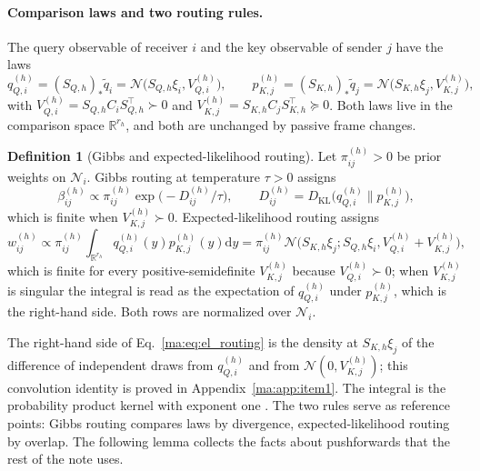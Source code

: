 \documentclass[11pt]{article}
\theoremstyle{definition}
\newtheorem{definition}[theorem]{Definition}
\theoremstyle{remark}
\providecommand{\KL}{D_{\mathrm{KL}}}
\newcommand{\R}{\mathbb R}
\newcommand{\Nset}{\mathcal N}
\newcommand{\Gauss}{\mathcal N}
\newcommand{\qt}{\widetilde q}
\begin{document}
\paragraph{Comparison laws and two routing rules.}
The query observable of receiver $i$ and the key observable of sender $j$ have the laws
\begin{equation}
q^{(h)}_{Q,i}=(S_{Q,h})_*\qt_i=\Gauss\bigl(S_{Q,h}\xi_i,V^{(h)}_{Q,i}\bigr),\qquad
p^{(h)}_{K,j}=(S_{K,h})_*\qt_j=\Gauss\bigl(S_{K,h}\xi_j,V^{(h)}_{K,j}\bigr),
\label{ma:eq:comparison_laws}
\end{equation}
with $V^{(h)}_{Q,i}=S_{Q,h}C_iS_{Q,h}^\top\succ0$ and $V^{(h)}_{K,j}=S_{K,h}C_jS_{K,h}^\top\succeq0$. Both laws live in the comparison space $\R^{r_h}$, and both are unchanged by passive frame changes.

\begin{definition}[Gibbs and expected-likelihood routing]
\label{ma:def:routing}
Let $\pi^{(h)}_{ij}>0$ be prior weights on $\Nset_i$. Gibbs routing at temperature $\tau>0$ assigns
\begin{equation}
\beta^{(h)}_{ij}\propto\pi^{(h)}_{ij}\exp\bigl(-D^{(h)}_{ij}/\tau\bigr),\qquad D^{(h)}_{ij}=\KL\bigl(q^{(h)}_{Q,i}\big\|p^{(h)}_{K,j}\bigr),
\label{ma:eq:gibbs}
\end{equation}
which is finite when $V^{(h)}_{K,j}\succ0$. Expected-likelihood routing assigns
\begin{equation}
w^{(h)}_{ij}\propto\pi^{(h)}_{ij}\int_{\R^{r_h}}q^{(h)}_{Q,i}(y)p^{(h)}_{K,j}(y)\mathrm dy=\pi^{(h)}_{ij}\Gauss\bigl(S_{K,h}\xi_j;S_{Q,h}\xi_i,V^{(h)}_{Q,i}+V^{(h)}_{K,j}\bigr),
\label{ma:eq:el_routing}
\end{equation}
which is finite for every positive-semidefinite $V^{(h)}_{K,j}$ because $V^{(h)}_{Q,i}\succ0$; when $V^{(h)}_{K,j}$ is singular the integral is read as the expectation of $q^{(h)}_{Q,i}$ under $p^{(h)}_{K,j}$, which is the right-hand side. Both rows are normalized over $\Nset_i$.
\end{definition}

The right-hand side of Eq.~\eqref{ma:eq:el_routing} is the density at $S_{K,h}\xi_j$ of the difference of independent draws from $q^{(h)}_{Q,i}$ and from $\Gauss(0,V^{(h)}_{K,j})$; this convolution identity is proved in Appendix~\ref{ma:app:item1}. The integral is the probability product kernel with exponent one \citep[Secs.~2.1 and~3.1]{Jebara2004ProbabilityProduct}. The two rules serve as reference points: Gibbs routing compares laws by divergence, expected-likelihood routing by overlap. The following lemma collects the facts about pushforwards that the rest of the note uses.
\end{document}

